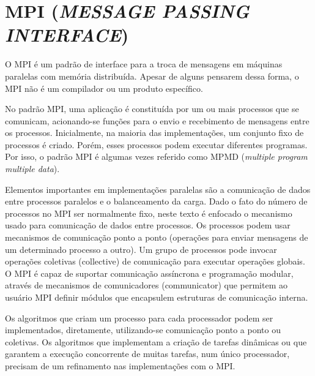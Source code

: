 \section{\normalsize MPI (\textit{MESSAGE PASSING INTERFACE})}
	O  MPI é um padrão de interface para a troca de mensagens em máquinas paralelas com memória distribuída. Apesar de alguns pensarem dessa forma, o MPI não é um compilador ou um produto específico.
	
	No padrão MPI, uma aplicação é constituída por um ou mais processos que se comunicam, acionando-se funções para o envio e recebimento de mensagens entre os processos. Inicialmente, na maioria das implementações, um conjunto fixo de processos é criado. Porém, esses processos podem executar diferentes programas. Por isso, o padrão MPI é algumas vezes referido como MPMD (\textit{multiple program multiple data}).

Elementos importantes em implementações paralelas são a comunicação de dados entre processos paralelos e o balanceamento da carga. Dado o fato do número de processos no MPI ser normalmente fixo, neste texto é enfocado o mecanismo usado para comunicação de dados entre processos. Os processos podem usar mecanismos de comunicação ponto a ponto (operações para enviar mensagens de um determinado processo a outro). Um grupo de processos pode invocar operações coletivas (collective) de comunicação para executar operações globais. O MPI é capaz de suportar comunicação assíncrona e programação modular, através de mecanismos de comunicadores (communicator) que permitem ao usuário MPI definir módulos que encapsulem estruturas de comunicação interna.

Os algoritmos que criam um processo para cada processador podem ser implementados, diretamente, utilizando-se comunicação ponto a ponto ou coletivas. Os algoritmos que implementam a criação de tarefas dinâmicas ou que garantem a execução concorrente de muitas tarefas, num único processador, precisam de um refinamento nas implementações com o MPI.